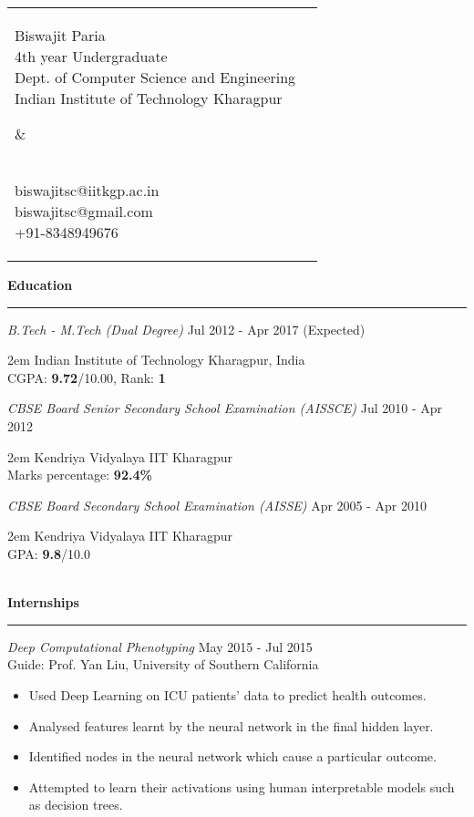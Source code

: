 \documentclass[a4paper,10pt,oneside]{article}
\makeatletter
\newcommand{\heading}[1]{
 {\Large \textbf{#1}}
  \vspace{0.4em}
  \hrule
  \vspace{0.4em}
}
\newcommand{\columnsplit}[4]{
  \begin{tabular*}{\textwidth}{l@{\cftdotfill{\cftsecdotsep}\extracolsep{\fill}}r}
   \parbox{#1}{
    \begin{flushleft}
     #2
    \end{flushleft}
   } &
   \parbox{#3}{
    \begin{flushright}
     #4
    \end{flushright}
   }
  \end{tabular*}
}
\newcommand{\SmallEntryGap}{ \vspace{0.6em} }
\newcommand{\EntryGap}{ ~\\ }
\newcommand{\doindent}[1]{\begin{adjustwidth}{2em}{} #1 \end{adjustwidth}}
\makeatother
\begin{document}


\columnsplit{4in}{
  {\huge Biswajit Paria}\\
  4th year Undergraduate\\
  Dept. of Computer Science and Engineering\\
  Indian Institute of Technology Kharagpur
  }
  {2in}{
  ~\\[1.3em]
  biswajitsc@iitkgp.ac.in\\
  biswajitsc@gmail.com\\
  +91-8348949676
  }

  


\heading{Education}

\SmallEntryGap
\emph{B.Tech - M.Tech (Dual Degree)} \hfill Jul 2012 - Apr 2017 (Expected)\\
  \doindent{Indian Institute of Technology Kharagpur, India\\
  CGPA: \textbf{9.72}/10.00, Rank: \textbf{1}}

\SmallEntryGap
  \emph{CBSE Board Senior Secondary School Examination (AISSCE)} \hfill Jul 2010 - Apr 2012\\
  \doindent{Kendriya Vidyalaya IIT Kharagpur\\
  Marks percentage: \textbf{92.4\%}}

\SmallEntryGap
\emph{CBSE Board Secondary School Examination (AISSE)} \hfill Apr 2005 - Apr 2010\\
  \doindent{Kendriya Vidyalaya IIT Kharagpur\\
  GPA: \textbf{9.8}/10.0}

\EntryGap


\heading{Internships}
\SmallEntryGap
\emph{Deep Computational Phenotyping} \hfill May 2015 - Jul 2015\\
Guide: Prof. Yan Liu, University of Southern California
\begin{itemize}[noitemsep, nolistsep]
 \item Used Deep Learning on ICU patients' data to predict health outcomes.
 \item Analysed features learnt by the neural network in the final hidden layer.
 \item Identified nodes in the neural network which cause a particular outcome.
 \item Attempted to learn their activations using human interpretable models such as decision trees.
\end{itemize}
\end{document}
